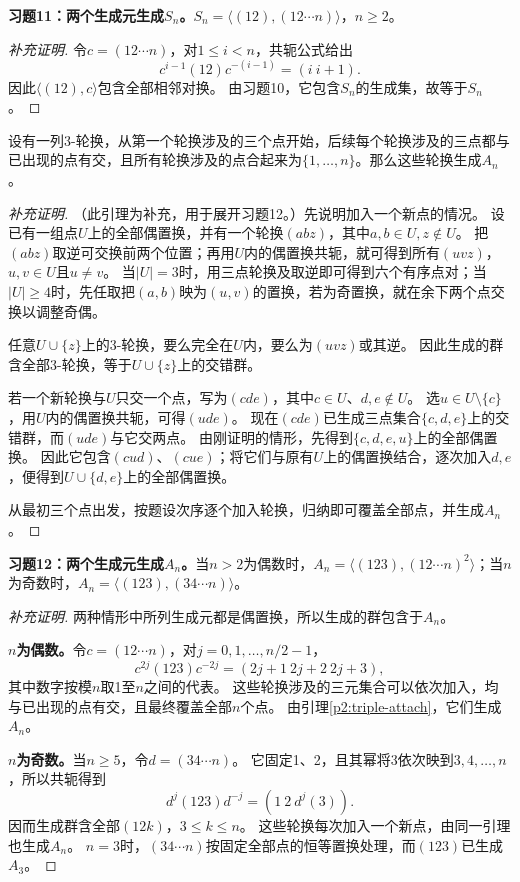 \begin{problem}
\textbf{习题11：两个生成元生成$S_n$。}$S_n=\langle(12),(12\cdots n)\rangle$，$n\geq2$。
\end{problem}
\begin{proof}[补充证明]
令$c=(12\cdots n)$，对$1\leq i<n$，共轭公式给出
\[
c^{i-1}(12)c^{-(i-1)}=(i\ i+1).
\]
因此$\langle(12),c\rangle$包含全部相邻对换。
由习题10，它包含$S_n$的生成集，故等于$S_n$。
\end{proof}

\begin{lemma}\label{p2:triple-attach}
设有一列3-轮换，从第一个轮换涉及的三个点开始，后续每个轮换涉及的三点都与已出现的点有交，且所有轮换涉及的点合起来为$\{1,\ldots,n\}$。那么这些轮换生成$A_n$。
\end{lemma}
\begin{proof}[补充证明]
（此引理为补充，用于展开习题12。）先说明加入一个新点的情况。
设已有一组点$U$上的全部偶置换，并有一个轮换$(abz)$，其中$a,b\in U,z\notin U$。
把$(abz)$取逆可交换前两个位置；再用$U$内的偶置换共轭，就可得到所有$(uvz)$，$u,v\in U$且$u\neq v$。
当$|U|=3$时，用三点轮换及取逆即可得到六个有序点对；当$|U|\geq4$时，先任取把$(a,b)$映为$(u,v)$的置换，若为奇置换，就在余下两个点交换以调整奇偶。

任意$U\cup\{z\}$上的3-轮换，要么完全在$U$内，要么为$(uvz)$或其逆。
因此生成的群含全部3-轮换，等于$U\cup\{z\}$上的交错群。

若一个新轮换与$U$只交一个点，写为$(cde)$，其中$c\in U$、$d,e\notin U$。
选$u\in U\setminus\{c\}$，用$U$内的偶置换共轭，可得$(ude)$。
现在$(cde)$已生成三点集合$\{c,d,e\}$上的交错群，而$(ude)$与它交两点。
由刚证明的情形，先得到$\{c,d,e,u\}$上的全部偶置换。
因此它包含$(cud)$、$(cue)$；将它们与原有$U$上的偶置换结合，逐次加入$d,e$，便得到$U\cup\{d,e\}$上的全部偶置换。

从最初三个点出发，按题设次序逐个加入轮换，归纳即可覆盖全部点，并生成$A_n$。
\end{proof}

\begin{problem}
\textbf{习题12：两个生成元生成$A_n$。}当$n>2$为偶数时，$A_n=\langle(123),(12\cdots n)^2\rangle$；当$n$为奇数时，$A_n=\langle(123),(34\cdots n)\rangle$。
\end{problem}
\begin{proof}[补充证明]
两种情形中所列生成元都是偶置换，所以生成的群包含于$A_n$。

\textbf{$n$为偶数。}令$c=(12\cdots n)$，对$j=0,1,\ldots,n/2-1$，
\[
c^{2j}(123)c^{-2j}=(2j+1\ 2j+2\ 2j+3),
\]
其中数字按模$n$取1至$n$之间的代表。
这些轮换涉及的三元集合可以依次加入，均与已出现的点有交，且最终覆盖全部$n$个点。
由引理\ref{p2:triple-attach}，它们生成$A_n$。

\textbf{$n$为奇数。}当$n\geq5$，令$d=(34\cdots n)$。
它固定1、2，且其幂将3依次映到$3,4,\ldots,n$，所以共轭得到
\[
d^j(123)d^{-j}=(1\ 2\ d^j(3)).
\]
因而生成群含全部$(12k)$，$3\leq k\leq n$。
这些轮换每次加入一个新点，由同一引理也生成$A_n$。
$n=3$时，$(34\cdots n)$按固定全部点的恒等置换处理，而$(123)$已生成$A_3$。
\end{proof}

